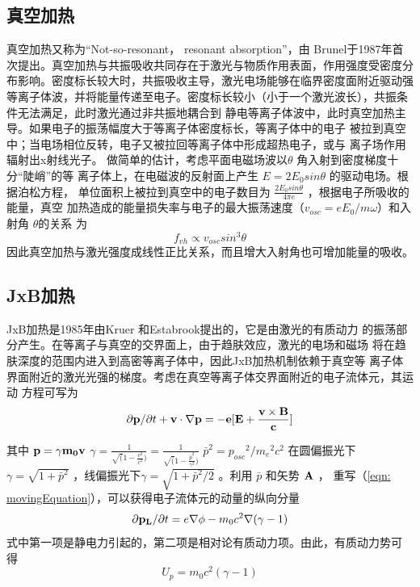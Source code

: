 \subsection{真空加热}
真空加热\cite{bulanov1994interaction, 
gibbon1992collisionless}又称为“Not-so-resonant， resonant absorption”，由
Brunel于1987年首次提出\cite{brunel1987not}。真空加热与共振吸收共同存在于激光与物质作用表面，作用强度受密度分布影响。密度标长较大时，共振吸收主导，激光电场能够在临界密度面附近驱动强等离子体波，并将能量传递至电子。密度标长较小（小于一个激光波长），共振条件无法满足，此时激光通过非共振地耦合到
静电等离子体波中，此时真空加热主导。如果电子的振荡幅度大于等离子体密度标长，等离子体中的电子
被拉到真空中；当电场相位反转，电子又被拉回等离子体中形成超热电子，或与
离子场作用辐射出x射线光子。
做简单的估计，考虑平面电磁场波以$\theta$ 角入射到密度梯度十分“陡峭”的等
离子体上，在电磁波的反射面上产生 $E=2 E_0 sin{\theta}$ 的驱动电场。根据泊松方程，
单位面积上被拉到真空中的电子数目为
$\frac{2 E_0 sin{\theta}}{4 \pi e}$
，根据电子所吸收的能量，真空
加热造成的能量损失率与电子的最大振荡速度（$v_{osc}=eE_0/m \omega$）和入射角 $\theta$的关系
为
\begin{equation}
\label{eqn: vocummHeating}
f_{vh} \propto v_{osc} sin^3 \theta
\end{equation}
因此真空加热与激光强度成线性正比关系，而且增大入射角也可增加能量的吸收。


\subsection{JxB加热}

JxB加热是1985年由Kruer 和Estabrook提出的\cite{kruer1985j}，它是由激光的有质动力
的振荡部分产生。在等离子与真空的交界面上，由于趋肤效应，激光的电场和磁场
将在趋肤深度的范围内进入到高密等离子体中，因此JxB加热机制依赖于真空等
离子体界面附近的激光光强的梯度。考虑在真空等离子体交界面附近的电子流体元，其运动
方程可写为\cite{wilks1997absorption}
\begin{equation}
\label{eqn: movingEquation}
\partial{\bf{p}}/\partial{t}+ \bf{v} \cdot 
\nabla{\bf{p}}=-e[\bf{E}+\frac{\bf{v} \times \bf{B}}{c}]
\end{equation}

其中 $\bf{p}=\gamma m_0 \bf{v}$
$\gamma=\frac{1}{\sqrt(1-\frac{v^2}{c^2})}=\frac{1}{\sqrt(1-\frac{{\bar{p}}^2}{{\gamma}^2})}$
${\bar{p}}^2 = {p_{osc}}^2/{m_e}^2c^2$
在圆偏振光下 $\gamma = \sqrt{1+{\bar{p}}^2}$ 
，线偏振光下$\gamma = \sqrt{1+{\bar{p}}^2/2}$ 。利用 $\bar{p}$ 和矢势 $\bf{A}$ ，
重写（\ref{eqn: movingEquation}），可以获得电子流体元的动量的纵向分量
\begin{equation}
\label{eqn: movingEquationX}
\partial{\bf{p}_L}/\partial{t}=e \nabla \phi -m_0 c^2 
\nabla{(\gamma -1)}
\end{equation}
式中第一项是静电力引起的，第二项是相对论有质动力项。由此，有质动力势可
得
\begin{equation}
\label{eqn: ponderomotivePotential}
U_p=m_0 c^2 (\gamma -1)
\end{equation}



